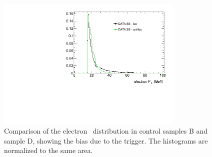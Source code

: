 \begin{figure}[tp]
	\begin{center}
	\includegraphics[width=9cm]{figure/ABCD_regionB_Vs_regionD}
	\end{center}
	\caption{Comparison of the electron \pt~distribution in control samples B and sample D, showing the bias due to the trigger. 
	The histograms are normalized to the same area.}
	\label{fig:BvsD}
\end{figure}





